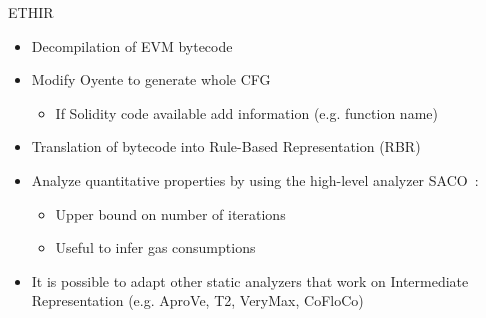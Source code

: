 \begin{frame}{ETHIR~\cite{bib:ETHIR}}
	\begin{itemize}
		\item Decompilation of EVM bytecode
		\item Modify Oyente to generate whole CFG
		\begin{itemize}
			\item If Solidity code available add information (e.g. function
			name)
		\end{itemize}
		\item Translation of bytecode into Rule-Based Representation (RBR)
		\item Analyze quantitative properties by using the high-level analyzer
		SACO~\cite{bib:SACO}:
		\begin{itemize}
			\item Upper bound on number of iterations
			\item Useful to infer gas consumptions
		\end{itemize}
		\item It is possible to adapt other static analyzers that work on
		Intermediate Representation (e.g. AproVe, T2, VeryMax, CoFloCo)
	\end{itemize}
\end{frame}

